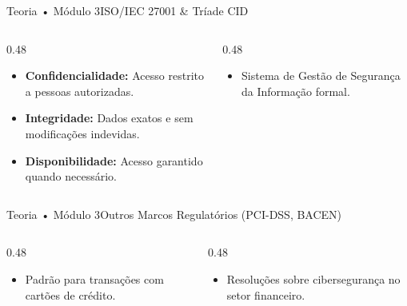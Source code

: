 \begin{senaiframe}{Teoria • Módulo 3}{ISO/IEC 27001 \& Tríade CID}
  \begin{columns}[t]
    \begin{column}{0.48\textwidth}
      \begin{tcolorbox}[senaibluecard, title={A Tríade CID}]
        \begin{itemize}
          \item \textbf{Confidencialidade:} Acesso restrito a pessoas autorizadas.
          \item \textbf{Integridade:} Dados exatos e sem modificações indevidas.
          \item \textbf{Disponibilidade:} Acesso garantido quando necessário.
        \end{itemize}
      \end{tcolorbox}
    \end{column}
    \begin{column}{0.48\textwidth}
      \begin{tcolorbox}[senaicard, title={SGSI}]
        \begin{itemize}
          \item Sistema de Gestão de Segurança da Informação formal.
        \end{itemize}
      \end{tcolorbox}
    \end{column}
  \end{columns}
\end{senaiframe}

\begin{senaiframe}{Teoria • Módulo 3}{Outros Marcos Regulatórios (PCI-DSS, BACEN)}
  \begin{columns}[t]
    \begin{column}{0.48\textwidth}
      \begin{tcolorbox}[senaibluecard, title={PCI-DSS}]
        \begin{itemize}
          \item Padrão para transações com cartões de crédito.
        \end{itemize}
      \end{tcolorbox}
    \end{column}
    \begin{column}{0.48\textwidth}
      \begin{tcolorbox}[senaicard, title={BACEN (Bancos)}]
        \begin{itemize}
          \item Resoluções sobre cibersegurança no setor financeiro.
        \end{itemize}
      \end{tcolorbox}
    \end{column}
  \end{columns}
\end{senaiframe}

